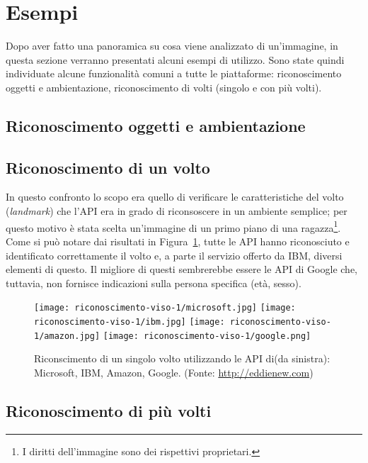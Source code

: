 
\section{Esempi}\label{sec:esempi}
Dopo aver fatto una panoramica su cosa viene analizzato di un'immagine, in questa sezione verranno presentati alcuni esempi di utilizzo.
Sono state quindi individuate alcune funzionalità comuni a tutte le piattaforme: riconoscimento oggetti e ambientazione, riconoscimento di volti (singolo e con più volti).
\subsection{Riconoscimento oggetti e ambientazione}\label{subsec:riconscimento-oggetti-ambientazione}
\subsection{Riconoscimento di un volto}\label{subsec:riconscimento-singolo-volto}
In questo confronto lo scopo era quello di verificare le caratteristiche del volto (\textit{landmark}) che l'API era in grado di riconsoscere in un ambiente semplice;
per questo motivo è stata scelta un'immagine di un primo piano di una ragazza\footnote{I diritti dell'immagine sono dei rispettivi proprietari.}.
Come si può notare dai risultati in Figura~\ref{fig:riconscimento-singolo-volto}, tutte le API hanno riconosciuto e identificato correttamente il volto e, a parte
il servizio offerto da IBM, diversi elementi di questo.
Il migliore di questi sembrerebbe essere le API di Google che, tuttavia, non fornisce indicazioni sulla persona specifica (età, sesso).
\begin{figure}[!h]
\begin{center}
	\texttt{[image: riconoscimento-viso-1/microsoft.jpg]}
	\texttt{[image: riconoscimento-viso-1/ibm.jpg]}
	\texttt{[image: riconoscimento-viso-1/amazon.jpg]}
	\texttt{[image: riconoscimento-viso-1/google.png]}
{\scriptsize \caption{Riconscimento di un singolo volto utilizzando le API di(da sinistra): Microsoft, IBM, Amazon, Google. (Fonte: \url{http://eddienew.com})}
\label{fig:riconscimento-singolo-volto}}
\end{center}
\end{figure}
%
\subsection{Riconoscimento di più volti}\label{subsec:riconscimento-piu-volti}
%
